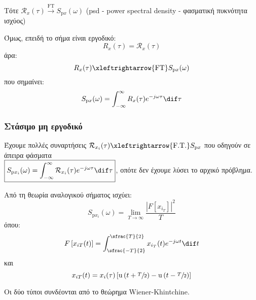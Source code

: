 \documentclass[11pt,a4paper,notitlepage,fleqn,final]{article}
\begin{document}
Τότε \( \mathcal{R}_x(\tau)
\xrightarrow{\text{FT}} S_{\mathrm px}(\omega ) \)
(psd - power spectral density - φασματική πυκνότητα ισχύος)

Όμως, επειδή το σήμα είναι εργοδικό:
\[
R_x(\tau) = \mathcal R_x(\tau)
\]
άρα:
\[
R_x(\tau) \xleftrightarrow{\mathrm{FT}} S_{\mathrm{p}x}(\omega )
\]
που σημαίνει:
\[
S_{\mathrm p x}(\omega ) = \int_{-\infty}^{\infty}
R_x(\tau)e^{-j\omega \tau}\dif\tau
\]

\subsubsection{Στάσιμο μη εργοδικό}
Έχουμε πολλές συναρτήσεις \( \mathcal{R}_{x_i}(\tau)
\xleftrightarrow{\text{F.T.}} S_{\mathrm p x}
 \) που οδηγούν σε άπειρα φάσματα \\
\( \displaystyle \boxed{S_{\mathrm p x_i}(\omega ) =
	 \int_{-\infty}^{\infty}
\mathcal{R}_{x_i}(\tau) e^{-j\omega \tau}\dif \tau} \), οπότε δεν
έχουμε λύσει το αρχικό πρόβλημα.

Από τη θεωρία αναλογικού σήματος ισχύει:
\[
\boxed{
S_{\mathrm p x_i}(\omega ) = \lim_{T\to \infty}
\frac{\left|F\left[x_{i_T}\right]\right|^2}{T}
}
\]
όπου:
\[
F\left[x_{iT}(t)\right]
= \int_{\sfrac{-T}{2} }^{\sfrac{T}{2} }
x_{i_T}(t) e^{-j\omega t}\dif t
\]
και
\[
x_{iT}(t) = x_i(\tau)\left[
\mathrm u\left(t+\sfrac{T}{2} \right)
-\mathrm u\left(t-\sfrac{T}{2} \right)
\right]
\]


Οι δύο τύποι συνδέονται από το θεώρημα Wiener-Khintchine.
\end{document}
